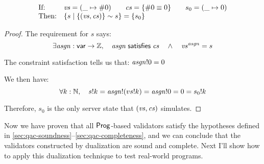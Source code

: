 \begin{lemma}[\ref{eq:rc3}]
\[\begin{array}{ll}
\text{If:}&
\mathit{vs}=(\_\mapsto\#0)\qquad
\mathit{cs}=\{\#0\equiv0\}\qquad
s_0=(\_\mapsto0)\\
\text{Then:}&\{s\mid\{(\mathit{vs},\mathit{cs})\}\sim s\}=\{s_0\}
\end{array}\]
\begin{proof}
The requirement for $s$ says:
\[\exists \mathit{asgn}:\mathsf{var}\to\mathbb Z,\quad\mathit{asgn}\;\mathsf{satisfies}\;\mathit{cs}\quad\wedge\quad \mathit{vs}^{\mathit{asgn}}=s\]

The constraint satisfaction tells us that:
\(\mathit{asgn}!0=0\)

We then have:
\[\forall k:\mathbb N,\quad s!k=\mathit{asgn}!(vs!k)=\mathit{asgn}!0=0=s_0!k\]

Therefore, $s_0$ is the only server state that $(\mathit{vs},\mathit{cs})$ simulates.
\end{proof}
\end{lemma}

Now we have proven that all $\mathsf{Prog}$-based validators satisfy the hypotheses
defined in \autoref{sec:qac-soundness}--\ref{sec:qac-completeness}, and we can
conclude that the validators constructed by dualization are sound and complete.
Next I'll show how to apply this dualization technique to test real-world
programs.

